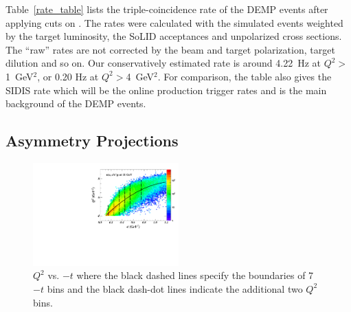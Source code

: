 Table~\ref{rate_table} lists the triple-coincidence rate of the DEMP
events after applying cuts on . The rates were calculated with the simulated events weighted by the
target luminosity, the SoLID acceptances and unpolarized cross sections.  The
``raw'' rates are not corrected by the beam and target polarization, target
dilution and so on.  Our conservatively estimated rate is around 4.22~Hz at $Q^{2}>$1~GeV$^{2}$, or 0.20 Hz
at $Q^{2}>$4~GeV$^{2}$. For comparison, the table also gives the SIDIS rate
which will be the online production trigger rates and is the main background of
the DEMP events.

\subsection{Asymmetry Projections}
\begin{figure}[!ht]
 \begin{center}
      \includegraphics[type=pdf,
        ext=.pdf,read=.pdf,width=0.5\textwidth]{./figures/E11_Q2_t_bin_02Hz} 
    \caption[$Q^{2}$ vs. $-t$]{\footnotesize{$Q^{2}$ vs. $-t$ where the black
dashed lines specify the boundaries of 7 $-t$ bins and the black dash-dot lines
indicate the additional two $Q^{2}$ bins. }}
  \label{Q2_t_bin}
  \end{center}
\end{figure}

